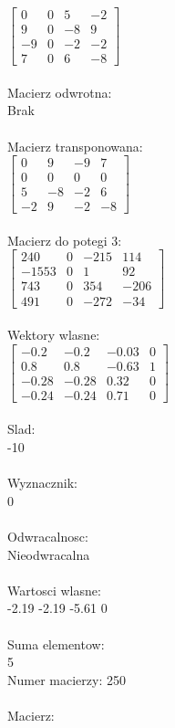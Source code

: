 \documentclass[a4paper,12pt]{article}
\begin{document}
$\begin{bmatrix} 0&0&5&-2\\9&0&-8&9\\-9&0&-2&-2\\7&0&6&-8 \end{bmatrix}$
\\
\\
Macierz odwrotna:\\

Brak
\\
\\
Macierz transponowana:\\

$\begin{bmatrix} 0&9&-9&7\\0&0&0&0\\5&-8&-2&6\\-2&9&-2&-8 \end{bmatrix}$
\\
\\
Macierz do potegi 3:\\

$\begin{bmatrix} 240&0&-215&114\\-1553&0&1&92\\743&0&354&-206\\491&0&-272&-34 \end{bmatrix}$
\\
\\
Wektory wlasne:\\

$\begin{bmatrix} -0.2&-0.2&-0.03&0\\0.8&0.8&-0.63&1\\-0.28&-0.28&0.32&0\\-0.24&-0.24&0.71&0 \end{bmatrix}$
\\
\\
Slad:\\
-10
\\
\\
Wyznacznik:\\
0
\\
\\
Odwracalnosc:\\
Nieodwracalna
\\
\\
Wartosci wlasne:\\
-2.19 -2.19 -5.61 0
\\
\\
Suma elementow:\\
5
\\
\newpage
Numer macierzy:
250
\\
\\
Macierz:\\
\end{document}
